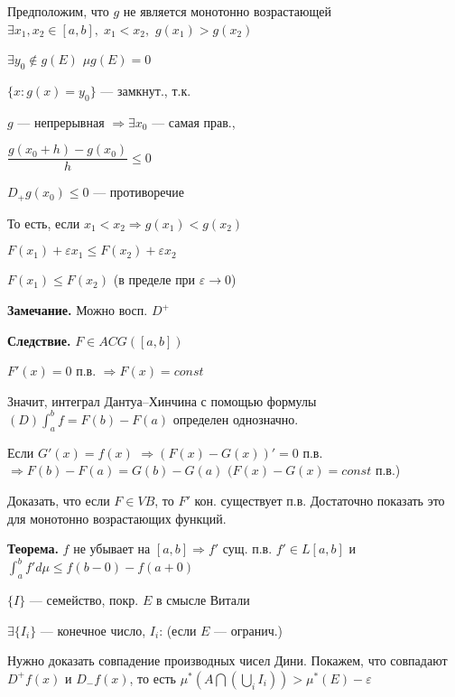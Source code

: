 Предположим, что $g$ не является монотонно возрастающей $\exists
x_1, x_2 \in [a,b], \; x_1<x_2, $ $g(x_1)
> g(x_2)$

%
%
%
%
%
%
%
%
%
%
%

$\exists y_0 \not \in g(E)$ $\mu g(E) = 0$

$\{x: g(x) = y_0\}$ --- замкнут., т.к.

$g$ --- непрерывная $\Rightarrow \exists x_0$ --- самая прав.,

$\dfrac{g(x_0 + h) - g(x_0)}{h} \leqslant 0$

$D_+ g(x_0) \leqslant 0$ --- противоречие

То есть, если $x_1 < x_2 \Rightarrow g(x_1) < g(x_2)$

$F(x_1) + \varepsilon x_1 \leqslant F(x_2) + \varepsilon x_2$

$F(x_1) \leqslant F(x_2)$ (в пределе при $\varepsilon \rightarrow
0$)

\textbf{Замечание.} \quad Можно восп. $D^+$

\textbf{Следствие.} \quad $F \in ACG([a,b])$

$F'(x) = 0$ п.в. $\Rightarrow F(x) = const$

Значит, интеграл Дантуа--Хинчина с помощью формулы $(D) \int_a^b f
= F(b) - F(a)$ определен однозначно.

Если $G'(x) = f(x)$ $\Rightarrow (F(x) - G(x))' = 0$ п.в.
$\Rightarrow F(b) - F(a) = G(b) - G(a)$ $(F(x) - G(x) = const$
п.в.)

Доказать, что если $F \in VB$, то $F'$ кон. существует п.в.
Достаточно показать это для монотонно возрастающих функций.

\textbf{Теорема.} \quad $f$ не убывает на $[a, b] \Rightarrow f'$
сущ. п.в. $f' \in L[a,b]$ и $\int_a^b f' d \mu \leqslant f(b - 0)
- f(a + 0)$

$\{I\}$ --- семейство, покр. $E$ в смысле Витали

$\exists \{I_i\}$ --- конечное число, $I_i$: (если $E$ ---
огранич.)

Нужно доказать совпадение производных чисел Дини. Покажем, что
совпадают $D^+ f(x)$ и $D_- f(x)$, то есть $\mu^* (A \bigcap
(\bigcup_i I_i)) > \mu^*(E) - \varepsilon$

